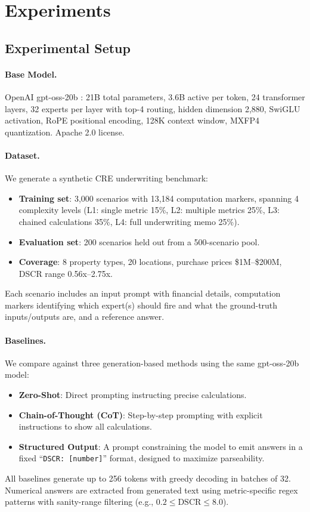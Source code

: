 \section{Experiments}
\label{sec:experiments}

\subsection{Experimental Setup}
\label{sec:exp:setup}

\paragraph{Base Model.}
OpenAI gpt-oss-20b \citep{openai2025gptoss}: 21B total parameters,
3.6B active per token, 24 transformer layers, 32 experts per layer with
top-4 routing, hidden dimension 2{,}880, SwiGLU activation, RoPE
positional encoding, 128K context window, MXFP4 quantization. Apache
2.0 license.

\paragraph{Dataset.}
We generate a synthetic CRE underwriting benchmark:
\begin{itemize}
\item \textbf{Training set}: 3{,}000 scenarios with 13{,}184 computation
markers, spanning 4 complexity levels (L1: single metric 15\%, L2:
multiple metrics 25\%, L3: chained calculations 35\%, L4: full
underwriting memo 25\%).
\item \textbf{Evaluation set}: 200 scenarios held out from a 500-scenario pool.
\item \textbf{Coverage}: 8 property types, 20 locations, purchase prices
\$1M--\$200M, DSCR range 0.56x--2.75x.
\end{itemize}
Each scenario includes an input prompt with financial details,
computation markers identifying which expert(s) should fire and what the
ground-truth inputs/outputs are, and a reference answer.

\paragraph{Baselines.}
We compare against three generation-based methods using the same
gpt-oss-20b model:
\begin{itemize}
\item \textbf{Zero-Shot}: Direct prompting instructing precise calculations.
\item \textbf{Chain-of-Thought (CoT)}: Step-by-step prompting with
explicit instructions to show all calculations.
\item \textbf{Structured Output}: A prompt constraining the model to
emit answers in a fixed ``\texttt{DSCR: [number]}'' format, designed
to maximize parseability.
\end{itemize}
All baselines generate up to 256 tokens with greedy decoding in
batches of 32. Numerical answers are extracted from generated text
using metric-specific regex patterns with sanity-range filtering
(e.g., $0.2 \leq \text{DSCR} \leq 8.0$).


